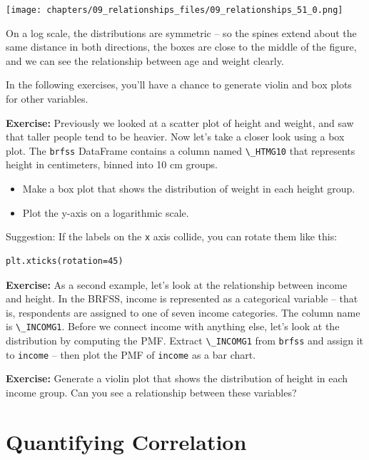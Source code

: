 \begin{center}
\texttt{[image: chapters/09\_relationships\_files/09\_relationships\_51\_0.png]}
\end{center}

On a log scale, the distributions are symmetric -- so the spines extend
about the same distance in both directions, the boxes are close to the
middle of the figure, and we can see the relationship between age and
weight clearly.

In the following exercises, you'll have a chance to generate violin and
box plots for other variables.

\textbf{Exercise:} Previously we looked at a scatter plot of height and
weight, and saw that taller people tend to be heavier. Now let's take a
closer look using a box plot. The \passthrough{\lstinline!brfss!}
DataFrame contains a column named \passthrough{\lstinline!\_HTMG10!}
that represents height in centimeters, binned into 10 cm groups.

\begin{itemize}
\item
  Make a box plot that shows the distribution of weight in each height
  group.
\item
  Plot the y-axis on a logarithmic scale.
\end{itemize}

Suggestion: If the labels on the \passthrough{\lstinline!x!} axis
collide, you can rotate them like this:

\begin{lstlisting}[style=output]
plt.xticks(rotation=45)
\end{lstlisting}

\textbf{Exercise:} As a second example, let's look at the relationship
between income and height. In the BRFSS, income is represented as a
categorical variable -- that is, respondents are assigned to one of
seven income categories. The column name is
\passthrough{\lstinline!\_INCOMG1!}. Before we connect income with
anything else, let's look at the distribution by computing the PMF.
Extract \passthrough{\lstinline!\_INCOMG1!} from
\passthrough{\lstinline!brfss!} and assign it to
\passthrough{\lstinline!income!} -- then plot the PMF of
\passthrough{\lstinline!income!} as a bar chart.

\textbf{Exercise:} Generate a violin plot that shows the distribution of
height in each income group. Can you see a relationship between these
variables?

\hypertarget{quantifying-correlation}{%
\section{Quantifying Correlation}\label{quantifying-correlation}}

